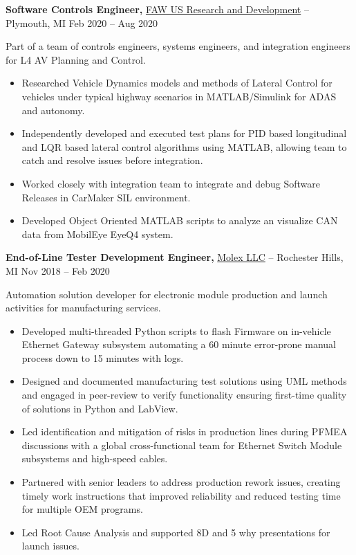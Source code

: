 \documentclass[11pt]{article}       %
\begin{document}
\textbf{Software Controls Engineer,} \href{}{FAW US Research and Development} -- Plymouth, MI \hfill Feb 2020 -- Aug 2020 \\
\vspace{-9pt}
\begin{flushleft}
  Part of a team of controls engineers, systems engineers, and integration engineers for L4 AV Planning and Control.
\end{flushleft}
\vspace{-21pt}
\begin{itemize}
  \item Researched Vehicle Dynamics models and methods of Lateral Control for vehicles under typical highway scenarios in MATLAB/Simulink for ADAS and autonomy.
  \item Independently developed and executed test plans for PID based longitudinal and LQR based lateral control algorithms using MATLAB, allowing team to catch and resolve issues before integration.
  \item Worked closely with integration team to integrate and debug Software Releases in CarMaker SIL environment.
  \item Developed Object Oriented MATLAB scripts to analyze an visualize CAN data from MobilEye EyeQ4 system.
\end{itemize}


\textbf{End-of-Line Tester Development Engineer,} \href{}{Molex LLC} -- Rochester Hills, MI \hfill Nov 2018 -- Feb 2020 \\
\vspace{-9pt}
\begin{flushleft}
  Automation solution developer for electronic module production and launch activities for manufacturing services.
\end{flushleft}
\vspace{-21pt}
\begin{itemize}
  \item Developed multi-threaded Python scripts to flash Firmware on in-vehicle Ethernet Gateway subsystem automating a 60 minute error-prone manual process down to 15 minutes with logs.
  \item Designed and documented manufacturing test solutions using UML methods and engaged in peer-review to verify functionality ensuring first-time quality of solutions in Python and LabView.
  \item Led identification and mitigation of risks in production lines during PFMEA discussions with a global cross-functional team for Ethernet Switch Module subsystems and high-speed cables.
  \item Partnered with senior leaders to address production rework issues, creating timely work instructions that improved reliability and reduced testing time for multiple OEM programs.
  \item Led Root Cause Analysis and supported 8D and 5 why presentations for launch issues.
\end{itemize}
\end{document}
